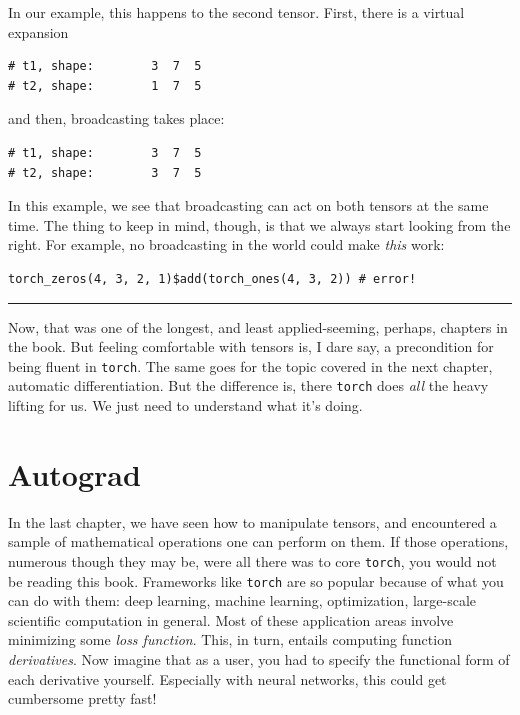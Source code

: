\documentclass[
  letterpaper,
]{krantz}
\begin{document}
In our example, this happens to the second tensor. First, there is a
virtual expansion

\begin{verbatim}
# t1, shape:        3  7  5
# t2, shape:        1  7  5
\end{verbatim}

and then, broadcasting takes place:

\begin{verbatim}
# t1, shape:        3  7  5
# t2, shape:        3  7  5
\end{verbatim}

In this example, we see that broadcasting can act on both tensors at the
same time. The thing to keep in mind, though, is that we always start
looking from the right. For example, no broadcasting in the world could
make \emph{this} work:

\begin{verbatim}
torch_zeros(4, 3, 2, 1)$add(torch_ones(4, 3, 2)) # error!
\end{verbatim}

\begin{center}\rule{0.5\linewidth}{0.5pt}\end{center}

Now, that was one of the longest, and least applied-seeming, perhaps,
chapters in the book. But feeling comfortable with tensors is, I dare
say, a precondition for being fluent in \texttt{torch}. The same goes
for the topic covered in the next chapter, automatic differentiation.
But the difference is, there \texttt{torch} does \emph{all} the heavy
lifting for us. We just need to understand what it's doing.

\hypertarget{sec:autograd}{%
\chapter{Autograd}\label{sec:autograd}}

In the last chapter, we have seen how to manipulate tensors, and
encountered a sample of mathematical operations one can perform on them.
If those operations, numerous though they may be, were all there was to
core \texttt{torch}, you would not be reading this book. Frameworks like
\texttt{torch} are so popular because of what you can do with them: deep
learning, machine learning, optimization, large-scale scientific
computation in general. Most of these application areas involve
minimizing some \emph{loss function}. This, in turn, entails computing
function \emph{derivatives}. Now imagine that as a user, you had to
specify the functional form of each derivative yourself. Especially with
neural networks, this could get cumbersome pretty fast!
\end{document}
